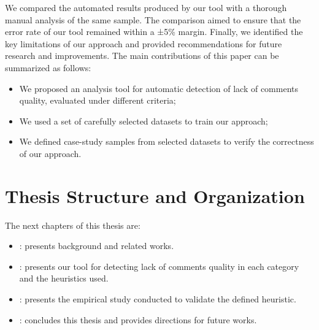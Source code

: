 \noindent We compared the automated results produced by our tool with a thorough manual analysis of the same sample. The comparison aimed to ensure that the error rate of our tool remained within a ±5\% margin. Finally, we identified the key limitations of our approach and provided recommendations for future research and improvements. The main contributions of this paper can be summarized as follows:
\begin{itemize}
    \item We proposed an analysis tool for automatic detection of lack of comments quality, evaluated under different criteria;
    \item We used a set of carefully selected datasets to train our approach;
    \item We defined case-study samples from selected datasets to verify the correctness of our approach.
\end{itemize}

\section{Thesis Structure and Organization}
The next chapters of this thesis are:

\begin{itemize}
\item {}: presents background and related works.
\item {}: presents our tool for detecting lack of comments quality in each category and the heuristics used.
\item {}: presents the empirical study conducted to validate the
defined heuristic.
\item {}: concludes this thesis and provides directions for future works.
\end{itemize}